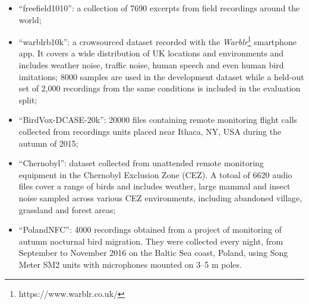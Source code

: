 \begin{itemize}
	\item ``freefield1010'': a collection of 7690 excerpts from field recordings around the world;
	\item ``warblrb10k'': a crowsourced dataset recorded with the \textit{Warblr}\footnote{https://www.warblr.co.uk/} smartphone app. It covers a wide distribution of UK locations and environments and includes weather noise, traffic noise, human speech and even human bird imitations; 8000 samples are used in the development dataset while a held-out set of 2,000 recordings from the same conditions is included in the evaluation split;
	\item ``BirdVox-DCASE-20k'': 20000 files containing remote monitoring flight calls collected from  recordings units placed near Ithaca, NY, USA during the autumn of 2015;
	\item ``Chernobyl'': dataset collected from unattended remote monitoring equipment in the Chernobyl Exclusion Zone (CEZ). A totoal of 6620 audio files cover a range of birds and includes weather, large mammal and insect noise sampled across various CEZ environments, including abandoned village, grassland and forest areas;
	\item ``PolandNFC'': 4000 recordings obtained from a project of monitoring of autumn nocturnal bird migration. They were collected every night, from September to November 2016 on the Baltic Sea coast, Poland, using Song Meter SM2 units with microphones mounted on 3–5 m poles.
\end{itemize}

%		
%		
%		

